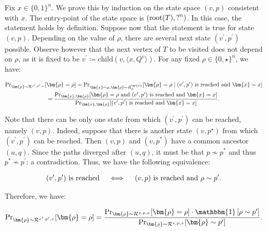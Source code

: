 \documentclass[10pt,a4paper]{article}
\begin{document}
Fix $x\in\{0,1\}^{n}$. We prove this by induction on the state space $(v,p)$ consistent with $x$. The entry-point of the state space is $(\textup{root}(T),\mathord{?}^{n})$. In this case, the statement holds by definition. Suppose now that the statement is true for state $(v,p)$. Depending on the value of $\rho$, there are several next state $(v^{\prime},p^{\prime})$ possible. Observe however that the next vertex of $T$ to be visited does not depend on $\rho$, as it is fixed to be $v^{\prime}\coloneqq\mathrm{child}(v,\langle x,Q^{v}\rangle)$. For any fixed $\rho\in\{0,\star\}^{n}$, we have:\par


\[\begin{gathered}
\displaystyle\Pr\nolimits_{\bm{\rho}\sim\mathcal{R}^{v^{\prime},p^{\prime},x}}[\bm{\rho}=\rho] \displaystyle=\Pr\nolimits_{\bm{x}\sim\mu,\bm{\rho}\sim R_{\mu}^{\bm{x}}}[\bm{\rho}=\rho\mid\textup{$(v^{\prime},p^{\prime})$ is reached and $\bm{x}=x$}] \\
\displaystyle=\frac{\Pr_{\bm{x},\bm{\rho}}[\textup{$\bm{\rho}=\rho$ and $(v^{\prime},p^{\prime})$ is reached and $\bm{x}=x$}]}{\Pr_{\bm{x},\bm{\rho}}[\textup{$(v^{\prime},p^{\prime})$ is reached and $\bm{x}=x$}]}.
\end{gathered}\]


Note that there can be only one state from which $(v^{\prime},p^{\prime})$ can be reached, namely $(v,p)$. Indeed, suppose that there is another state $(v,p^{\star})$ from which $(v^{\prime},p^{\prime})$ can be reached. Then $(v,p)$ and $(v,p^{*})$ have a common ancestor $(u,q)$. Since the paths diverged after $(u,q)$, it must be that $p\nsim p^{*}$ and thus $p^{*}\nsim p^{\prime}$: a contradiction. Thus, we have the following equivalence:\par


\[\begin{gathered}
\textup{$(v^{\prime},p^{\prime})$ is reached}\quad\iff\quad\textup{$(v,p)$ is reached and $\rho\sim p^{\prime}$}.
\end{gathered}\]


Therefore, we have:\par


\[\begin{gathered}
\Pr\nolimits_{\bm{\rho}\sim\mathcal{R}^{v^{\prime},p^{\prime},x}}[\bm{\rho}=\rho]=\frac{\Pr_{\bm{\rho}\sim\mathcal{R}^{v,p,x}}[\bm{\rho}=\rho]\cdot\mathbbm{1}\left[\rho\sim p^{\prime}\right]}{\Pr_{\bm{\rho}\sim\mathcal{R}^{v,p,x}}[\bm{\rho}\sim p^{\prime}]}.
\end{gathered}\]
\end{document}
